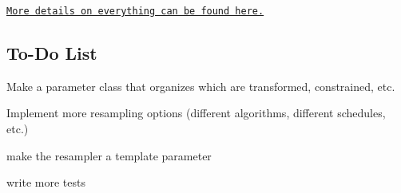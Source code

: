 \href{https://tbrown122387.github.io/ssm/}{\tt More details on everything can be found here.}

\subsection*{To-\/\+Do List}


\begin{DoxyItemize}
\item Make a parameter class that organizes which are transformed, constrained, etc.
\item Implement more resampling options (different algorithms, different schedules, etc.)
\item make the resampler a template parameter
\item write more tests 
\end{DoxyItemize}